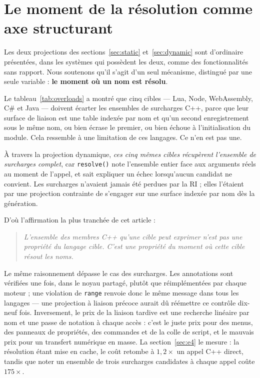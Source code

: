\documentclass[11pt,a4paper]{article}
\newcommand{\code}[1]{\texttt{\small #1}}
\begin{document}
\section{Le moment de la résolution comme axe structurant}
\label{sec:resolution}

Les deux projections des sections~\ref{sec:static} et~\ref{sec:dynamic} sont
d'ordinaire présentées, dans les systèmes qui possèdent les deux, comme des
fonctionnalités sans rapport. Nous soutenons qu'il s'agit d'un seul mécanisme,
distingué par une seule variable : \textbf{le moment où un nom est résolu}.

Le tableau~\ref{tab:overloads} a montré que cinq cibles --- Lua, Node,
WebAssembly, C\# et Java --- doivent écarter les ensembles de surcharges C++,
parce que leur surface de liaison est une table indexée par nom et qu'un second
enregistrement sous le même nom, ou bien écrase le premier, ou bien échoue à
l'initialisation du module. Cela ressemble à une limitation de ces langages. Ce
n'en est pas une.

À travers la projection dynamique, \emph{ces cinq mêmes cibles récupèrent
l'ensemble de surcharges complet}, car \code{resolve()} note l'ensemble entier
face aux arguments réels au moment de l'appel, et sait expliquer un échec
lorsqu'aucun candidat ne convient. Les surcharges n'avaient jamais été perdues
par la RI ; elles l'étaient par une projection contrainte de s'engager sur une
surface indexée par nom dès la génération.

D'où l'affirmation la plus tranchée de cet article :

\begin{quote}\itshape
L'ensemble des membres C++ qu'une cible peut exprimer n'est pas une propriété du
langage cible. C'est une propriété du moment où cette cible résout les noms.
\end{quote}

Le même raisonnement dépasse le cas des surcharges. Les annotations sont
vérifiées une fois, dans le noyau partagé, plutôt que réimplémentées par chaque
moteur ; une violation de \code{range} renvoie donc le même message dans tous les
langages --- une projection à liaison précoce aurait dû réémettre ce contrôle
dix-neuf fois. Inversement, le prix de la liaison tardive est une recherche
linéaire par nom et une passe de notation à chaque accès : c'est le juste prix
pour des menus, des panneaux de propriétés, des commandes et de la colle de
script, et le mauvais prix pour un transfert numérique en masse. La
section~\ref{sec:e4} le mesure : la résolution étant mise en cache, le coût
retombe à $1{,}2\times$ un appel C++ direct, tandis que noter un ensemble de trois
surcharges candidates à chaque appel coûte $175\times$.
\end{document}
